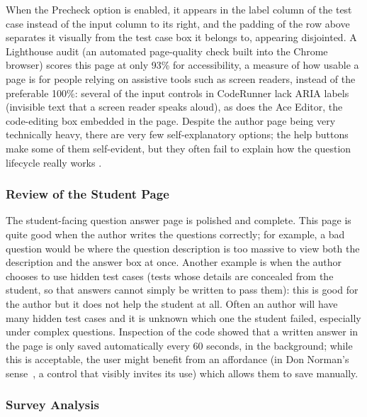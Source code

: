 When the Precheck option is enabled, it appears in the label column of the test case instead of the input column to its right, and the padding of the row above separates it visually from the test case box it belongs to, appearing disjointed. A Lighthouse audit (an automated page-quality check built into the Chrome browser) scores this page at only 93\% for accessibility, a measure of how usable a page is for people relying on assistive tools such as screen readers, instead of the preferable 100\%: several of the input controls in CodeRunner lack ARIA labels (invisible text that a screen reader speaks aloud), as does the Ace Editor, the code-editing box embedded in the page. Despite the author page being very technically heavy, there are very few self-explanatory options; the help buttons make some of them self-evident, but they often fail to explain how the question lifecycle really works \cite{dontmakemethink}.

\subsubsection{Review of the Student Page}
The student-facing question answer page is polished and complete. This page is quite good when the author writes the questions correctly; for example, a bad question would be where the question description is too massive to view both the description and the answer box at once. Another example is when the author chooses to use hidden test cases (tests whose details are concealed from the student, so that answers cannot simply be written to pass them): this is good for the author but it does not help the student at all. Often an author will have many hidden test cases and it is unknown which one the student failed, especially under complex questions. Inspection of the code showed that a written answer in the page is only saved automatically every 60 seconds, in the background; while this is acceptable, the user might benefit from an affordance (in Don Norman's sense~\cite{designofeveryday}, a control that visibly invites its use) which allows them to save manually.

\subsubsection{Survey Analysis}

